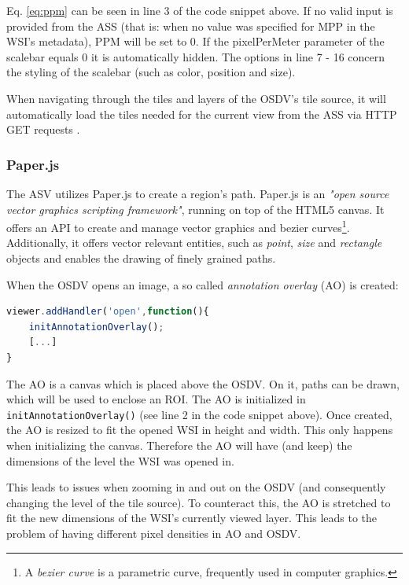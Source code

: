 Eq. \ref{eq:ppm} can be seen in line 3 of the code snippet above.  If no valid input is provided from the ASS (that is: when no value was specified for MPP in the WSI's metadata), PPM will be set to 0. If the pixelPerMeter parameter of the scalebar equals 0 it is automatically hidden\cite{web:openseadragon}. The options in line 7 - 16 concern the styling of the scalebar (such as color, position and size).

When navigating through the tiles and layers of the OSDV's tile source, it will automatically load the tiles needed for the current view from the ASS via HTTP GET requests \cite{web:openseadragon}.


\subsubsection{Paper.js}
The ASV utilizes Paper.js to create a region's path. Paper.js is an \emph{"open source vector graphics scripting framework"}, running on top of the HTML5 canvas\cite{web:paper}. It offers an API to create and manage vector graphics and bezier curves\footnote{
	A \emph{bezier curve} is a parametric curve, frequently used in computer graphics\cite{Strang03}.
}. Additionally, it offers vector relevant entities, such as \emph{point}, \emph{size} and \emph{rectangle} objects and enables the drawing of finely grained paths.

When the OSDV opens an image, a so called \emph{annotation overlay} (AO) is created:
\begin{lstlisting}[title=Excerpt from \texttt{initAnnotationService()} in as{\textunderscore}viewer.js, frame=single, language=JavaScript]
viewer.addHandler('open',function(){
	initAnnotationOverlay();
	[...]
}
\end{lstlisting}

The AO is a canvas which is placed above the OSDV. On it, paths can be drawn, which will be used to enclose an ROI. The AO is initialized in \texttt{initAnnotationOverlay()} (see line 2 in the code snippet above). Once created, the AO is resized to fit the opened WSI in height and width. This only happens when initializing the canvas. Therefore the AO will have (and keep) the dimensions of the level the WSI was opened in.

This leads to issues when zooming in and out on the OSDV (and consequently changing the level of the tile source). To counteract this, the AO is stretched to fit the new dimensions of the WSI's currently viewed layer. This leads to the problem of having different pixel densities in AO and OSDV.

